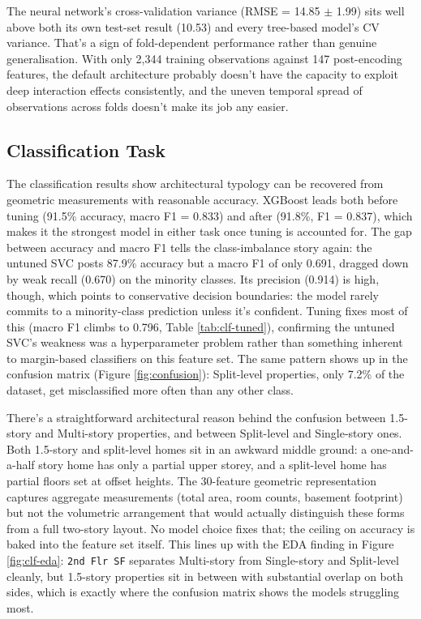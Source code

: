 \documentclass[11pt,a4paper]{article}
\begin{document}
The neural network's cross-validation variance (RMSE = 14.85 \(\pm\)
1.99) sits well above both its own test-set result (10.53) and every
tree-based model's CV variance. That's a sign of fold-dependent
performance rather than genuine generalisation. With only 2,344 training
observations against 147 post-encoding features, the default
architecture probably doesn't have the capacity to exploit deep
interaction effects consistently, and the uneven temporal spread of
observations across folds doesn't make its job any easier.

\subsection{Classification Task}\label{classification-task}

The classification results show architectural typology can be recovered
from geometric measurements with reasonable accuracy. XGBoost leads both
before tuning (91.5\% accuracy, macro F1 = 0.833) and after (91.8\%, F1
= 0.837), which makes it the strongest model in either task once tuning
is accounted for. The gap between accuracy and macro F1 tells the
class-imbalance story again: the untuned SVC posts 87.9\% accuracy but a
macro F1 of only 0.691, dragged down by weak recall (0.670) on the
minority classes. Its precision (0.914) is high, though, which points to
conservative decision boundaries: the model rarely commits to a
minority-class prediction unless it's confident. Tuning fixes most of
this (macro F1 climbs to 0.796, Table \ref{tab:clf-tuned}), confirming
the untuned SVC's weakness was a hyperparameter problem rather than
something inherent to margin-based classifiers on this feature set. The
same pattern shows up in the confusion matrix (Figure
\ref{fig:confusion}): Split-level properties, only 7.2\% of the dataset,
get misclassified more often than any other class.

There's a straightforward architectural reason behind the confusion
between 1.5-story and Multi-story properties, and between Split-level
and Single-story ones. Both 1.5-story and split-level homes sit in an
awkward middle ground: a one-and-a-half story home has only a partial
upper storey, and a split-level home has partial floors set at offset
heights. The 30-feature geometric representation captures aggregate
measurements (total area, room counts, basement footprint) but not the
volumetric arrangement that would actually distinguish these forms from
a full two-story layout. No model choice fixes that; the ceiling on
accuracy is baked into the feature set itself. This lines up with the
EDA finding in Figure \ref{fig:clf-eda}: \texttt{2nd\ Flr\ SF} separates
Multi-story from Single-story and Split-level cleanly, but 1.5-story
properties sit in between with substantial overlap on both sides, which
is exactly where the confusion matrix shows the models struggling most.
\end{document}

